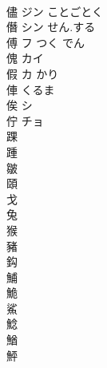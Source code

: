 \documentclass[8pt]{extreport}
\begin{document}
\begin{CJK}{UTF8}{min}
\\	儘	ジン ことごとく			
\\	僭	シン せん.する			
\\	傅	フ つく でん			
\\	傀	カイ			
\\	假	カ かり			
\\	俥	くるま			
\\	俟	シ			
\\	佇	チョ			
\\	踝						
\\	踵						
\\	皺						
\\	頤						
\\	戈						
\\	兔						
\\	猴						
\\	豬						
\\	鈎						
\\	鯆						
\\	鮠						
\\	鯊						
\\	鯰						
\\	鰌						
\\	鮃						
\end{CJK}
\end{document}
